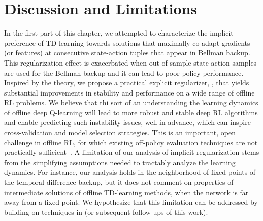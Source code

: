 \documentclass[../thesis.tex]{subfiles}
\begin{document}
\section{Discussion and Limitations}

In the first part of this chapter, we attempted to characterize the implicit preference of TD-learning towards solutions that maximally co-adapt gradients (or features) at consecutive state-action tuples that appear in Bellman backup. This regularization effect is exacerbated when out-of-sample
state-action samples are used for the Bellman backup and it can lead to poor policy performance. Inspired by the theory, we propose a practical explicit regularizer, \methodname, that yields substantial improvements in stability and performance on a wide range of offline RL problems. We believe that thi sort of an understanding the learning dynamics of offline deep Q-learning will lead to more robust and stable deep RL algorithms and enable predicting such instability issues, well in advance, which can inspire cross-validation and model selection strategies. This is an important, open challenge in offline RL, for which existing off-policy evaluation techniques are not practically sufficient~\citep{fu2021benchmarks,kumar2022workflow}. 
A limitation of our analysis of implicit regularization stems from the simplifying assumptions needed to tractably analyze the learning dynamics. For instance, our analysis holds in the neighborhood of fixed points of the temporal-difference backup, but it does not comment on properties of intermediate solutions of offline TD-learning methods, when the network is far away from a fixed point. We hypothesize that this limitation can be addressed by building on techniques in \citet{damian2021label} (or subsequent follow-ups of this work).   
\end{document}
